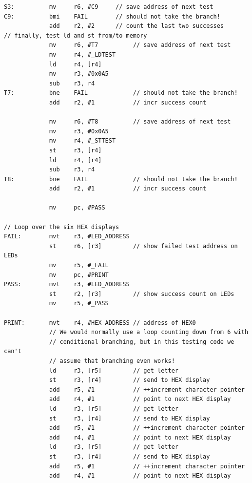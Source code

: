 \documentclass[epsfig,10pt,fullpage]{article} \addtolength{\textwidth}{1.5in}
\begin{document}
\begin{enumerate}
\begin{center}
\begin{minipage}[t]{14 cm}
\begin{lstlisting}[name=proc]
S3:          mv     r6, #C9     // save address of next test
C9:          bmi    FAIL        // should not take the branch!
             add    r2, #2      // count the last two successes
// finally, test ld and st from/to memory
             mv     r6, #T7          // save address of next test
             mv     r4, #_LDTEST
             ld     r4, [r4]
             mv     r3, #0x0A5
             sub    r3, r4
T7:          bne    FAIL             // should not take the branch!
             add    r2, #1           // incr success count

             mv     r6, #T8          // save address of next test
             mv     r3, #0x0A5
             mv     r4, #_STTEST
             st     r3, [r4]        
             ld     r4, [r4]
             sub    r3, r4
T8:          bne    FAIL             // should not take the branch!
             add    r2, #1           // incr success count

             mv     pc, #PASS

// Loop over the six HEX displays
FAIL:        mvt    r3, #LED_ADDRESS
             st     r6, [r3]         // show failed test address on LEDs
             mv     r5, #_FAIL
             mv     pc, #PRINT
PASS:        mvt    r3, #LED_ADDRESS
             st     r2, [r3]         // show success count on LEDs
             mv     r5, #_PASS

PRINT:       mvt    r4, #HEX_ADDRESS // address of HEX0 
             // We would normally use a loop counting down from 6 with 
             // conditional branching, but in this testing code we can't
             // assume that branching even works!
             ld     r3, [r5]         // get letter 
             st     r3, [r4]         // send to HEX display
             add    r5, #1           // ++increment character pointer 
             add    r4, #1           // point to next HEX display
             ld     r3, [r5]         // get letter 
             st     r3, [r4]         // send to HEX display
             add    r5, #1           // ++increment character pointer 
             add    r4, #1           // point to next HEX display
             ld     r3, [r5]         // get letter 
             st     r3, [r4]         // send to HEX display
             add    r5, #1           // ++increment character pointer 
             add    r4, #1           // point to next HEX display
\end{lstlisting}
\end{minipage}
\end{center}


\end{enumerate}
\end{document}
